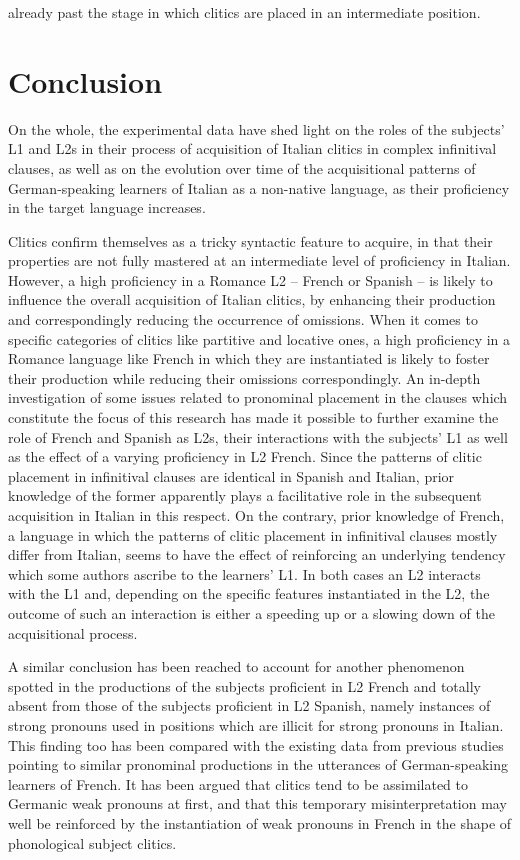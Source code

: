\documentclass[output=paper,modfonts,nonflat,newtxmath]{langsci/langscibook}
\begin{document}
already past the stage in which clitics are placed in an intermediate position.

\section{Conclusion} %

\label{sec:sciutti:6}

On the whole, the experimental data have shed light on the roles of the subjects’ L1 and L2s in their process of acquisition of Italian clitics in complex infinitival clauses, as well as on the evolution over time of the acquisitional patterns of German-speaking learners of Italian as a non-native language, as their proficiency in the target language increases.

Clitics confirm themselves as a tricky syntactic feature to acquire, in that their properties are not fully mastered at an intermediate level of proficiency in Italian. However, a high proficiency in a Romance L2 – French or Spanish – is likely to influence the overall acquisition of Italian clitics, by enhancing their production and correspondingly reducing the occurrence of omissions. When it comes to specific categories of clitics like partitive and locative ones, a high proficiency in a Romance language like French in which they are instantiated is likely to foster their production while reducing their omissions correspondingly. An in-depth investigation of some issues related to pronominal placement in the clauses which constitute the focus of this research has made it possible to further examine the role of French and Spanish as L2s, their interactions with the subjects’ L1 as well as the effect of a varying proficiency in L2 French. Since the patterns of clitic placement in infinitival clauses are identical in Spanish and Italian, prior knowledge of the former apparently plays a facilitative role in the subsequent acquisition in Italian in this respect. On the contrary, prior knowledge of French, a language in which the patterns of clitic placement in infinitival clauses mostly differ from Italian, seems to have the effect of reinforcing an underlying tendency which some authors ascribe to the learners’ L1. In both cases an L2 interacts with the L1 and, depending on the specific features instantiated in the L2, the outcome of such an interaction is either a speeding up or a slowing down of the acquisitional process.

A similar conclusion has been reached to account for another phenomenon spotted in the productions of the subjects proficient in L2 French and totally absent from those of the subjects proficient in L2 Spanish, namely instances of strong pronouns used in positions which are illicit for strong pronouns in Italian. This finding too has been compared with the existing data from previous studies pointing to similar pronominal productions in the utterances of German-speaking learners of French. It has been argued that clitics tend to be assimilated to Germanic weak pronouns at first, and that this temporary misinterpretation may well be reinforced by the instantiation of weak pronouns in French in the shape of phonological subject clitics.
\end{document}
